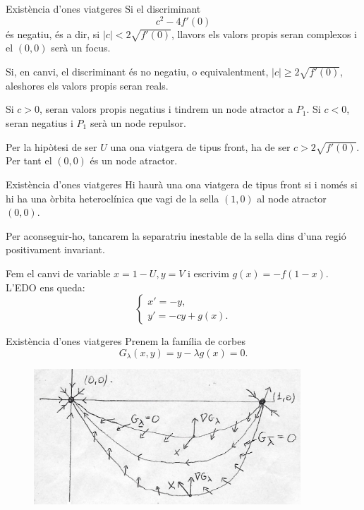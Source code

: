 \documentclass{beamer}
\theoremstyle{definition}
\begin{document}
\begin{frame}{Exist\`{e}ncia d'ones viatgeres}
Si el discriminant
\[c^2-4f'(0)\]
\'{e}s negatiu, \'{e}s a dir, si $|c|<2\sqrt{f'(0)}$, llavors els valors propis seran complexos i el $(0,0)$ ser\`{a} un focus.
\pause

Si, en canvi, el discriminant \'{e}s no negatiu, o equivalentment, $|c|\geq2\sqrt{f'(0)}$, aleshores els valors propis seran reals.
\pause

Si $c>0$, seran  valors propis negatius i tindrem un node atractor a $P_1$. Si $c<0$, seran negatius i $P_1$ ser\`{a} un node repulsor.
\pause

Per la hip\`{o}tesi de ser $U$ una ona viatgera de tipus front, ha de ser $c>2\sqrt{f'(0)}$. Per tant el $(0,0)$ \'{e}s un node atractor.
\end{frame}

\begin{frame}{Exist\`{e}ncia d'ones viatgeres}
Hi haur\`{a} una ona viatgera de tipus front si i nom\'{e}s si hi ha una \`{o}rbita heterocl\'{i}nica que vagi de la sella $(1,0)$ al node atractor $(0,0)$.
\pause

Per aconseguir-ho, tancarem la separatriu inestable de la sella dins d'una regi\'{o} positivament invariant.
\pause

Fem el canvi de variable $x=1-U,y=V$ i escrivim $g(x)=-f(1-x)$. L'EDO ens queda:
\[\left\{\begin{array}{l}x'=-y,\\y'=-cy+g(x).\end{array}\right.\]
\end{frame}

\begin{frame}{Exist\`{e}ncia d'ones viatgeres}
Prenem la fam\'{i}lia de corbes
\[G_{\lambda}(x,y)=y-\lambda g(x)=0.\]
\pause
\begin{figure}[ht!]
\begin{center}
\includegraphics[width=10cm]{Lluna.jpg}
\end{center}
\end{figure}
\end{frame}
\end{document}
